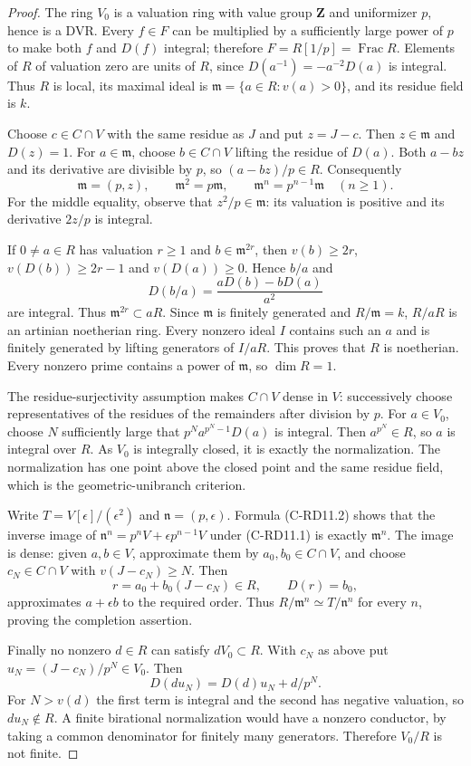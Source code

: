 \begin{proof}
The ring $V_0$ is a valuation ring with value group $\mathbf Z$ and
uniformizer $p$, hence is a DVR. Every $f\in F$ can be multiplied by
a sufficiently large power of $p$ to make both $f$ and $D(f)$ integral;
therefore $F=R[1/p]=\operatorname{Frac}R$. Elements of $R$ of valuation
zero are units of $R$, since $D(a^{-1})=-a^{-2}D(a)$ is integral.
Thus $R$ is local, its maximal ideal is
$\mathfrak m=\{a\in R:v(a)>0\}$, and its residue field is $k$.

Choose $c\in C\cap V$ with the same residue as $J$ and put $z=J-c$.
Then $z\in\mathfrak m$ and $D(z)=1$. For $a\in\mathfrak m$, choose
$b\in C\cap V$ lifting the residue of $D(a)$. Both $a-bz$ and its
derivative are divisible by $p$, so $(a-bz)/p\in R$. Consequently
\[
 \mathfrak m=(p,z),\qquad \mathfrak m^2=p\mathfrak m,
 \qquad \mathfrak m^n=p^{n-1}\mathfrak m\quad(n\geq1). \tag{C-RD11.2}
\]
For the middle equality, observe that $z^2/p\in\mathfrak m$: its
valuation is positive and its derivative $2z/p$ is integral.

If $0\ne a\in R$ has valuation $r\geq1$ and
$b\in\mathfrak m^{2r}$, then
$v(b)\geq2r$, $v(D(b))\geq2r-1$ and $v(D(a))\geq0$. Hence
$b/a$ and
\[
 D(b/a)=\frac{aD(b)-bD(a)}{a^2}
\]
are integral. Thus $\mathfrak m^{2r}\subset aR$.
Since $\mathfrak m$ is finitely generated and $R/\mathfrak m=k$,
$R/aR$ is an artinian noetherian ring. Every nonzero ideal $I$ contains
such an $a$ and is finitely generated by lifting generators of $I/aR$.
This proves that $R$ is noetherian. Every nonzero prime contains a
power of $\mathfrak m$, so $\dim R=1$.

The residue-surjectivity assumption makes $C\cap V$ dense in $V$:
successively choose representatives of the residues of the remainders
after division by $p$. For $a\in V_0$, choose $N$ sufficiently large
that $p^Na^{p^N-1}D(a)$ is integral. Then $a^{p^N}\in R$, so $a$
is integral over $R$.
As $V_0$ is integrally closed, it is exactly the normalization. The
normalization has one point above the closed point and the same
residue field, which is the geometric-unibranch criterion.

Write $T=V[\epsilon]/(\epsilon^2)$ and
$\mathfrak n=(p,\epsilon)$. Formula (C-RD11.2) shows that the
inverse image of $\mathfrak n^n=p^nV+\epsilon p^{n-1}V$ under
(C-RD11.1) is exactly $\mathfrak m^n$. The image is dense: given
$a,b\in V$, approximate them by $a_0,b_0\in C\cap V$, and choose
$c_N\in C\cap V$ with $v(J-c_N)\geq N$. Then
\[
 r=a_0+b_0(J-c_N)\in R,\qquad D(r)=b_0,
\]
approximates $a+\epsilon b$ to the required order. Thus
$R/\mathfrak m^n\simeq T/\mathfrak n^n$ for every $n$, proving the
completion assertion.

Finally no nonzero $d\in R$ can satisfy $dV_0\subset R$. With $c_N$
as above put $u_N=(J-c_N)/p^N\in V_0$. Then
\[
 D(du_N)=D(d)u_N+d/p^N.
\]
For $N>v(d)$ the first term is integral and the second has negative
valuation, so $du_N\notin R$. A finite birational normalization
would have a nonzero conductor, by taking a common denominator for
finitely many generators. Therefore $V_0/R$ is not finite.
\end{proof}

